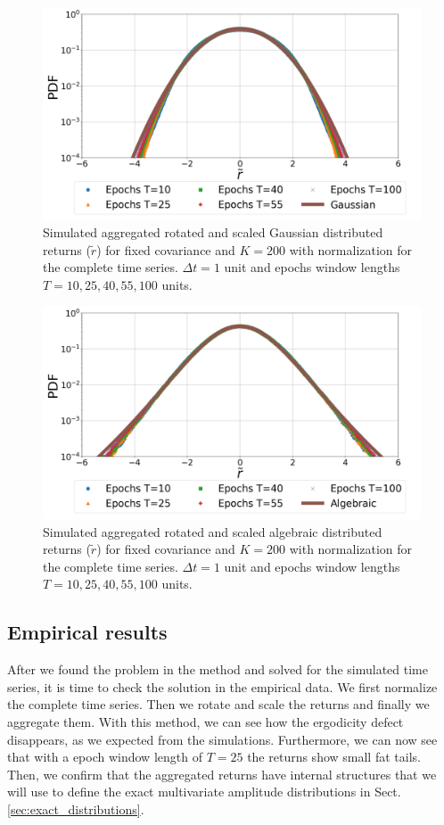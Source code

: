 \begin{figure}[htbp]
    \centering
    \includegraphics[width=0.6\columnwidth]
    {figures/06_epochs_sim_gauss_ts_norm.png}
    \caption{Simulated aggregated rotated and scaled Gaussian distributed
             returns ($\tilde{r}$) for fixed covariance and $K=200$ with
             normalization for the complete time series. $\Delta t = 1$ unit
             and epochs window lengths $T=10, 25, 40, 55, 100$ units.}
    \label{fig:epochs_gauss_agg_ret_pairs_norm_full_ts}
\end{figure}

\begin{figure}[htbp]
    \centering
    \includegraphics[width=0.6\columnwidth]
    {figures/06_epochs_sim_alg_ts_norm.png}
    \caption{Simulated aggregated rotated and scaled algebraic distributed
             returns ($\tilde{r}$) for fixed covariance and $K=200$ with
             normalization for the complete time series. $\Delta t = 1$ unit
             and epochs window lengths $T=10, 25, 40, 55, 100$ units.}
    \label{fig:epochs_alg_agg_ret_pairs_norm_full_ts}
\end{figure}

\subsection{Empirical results}
\label{subsec:emp_results}

After we found the problem in the method and solved for the simulated time
series, it is time to check the solution in the empirical data. We first
normalize the complete time series. Then we rotate and scale the returns and
finally we aggregate them. With this method, we can see how the ergodicity
defect disappears, as we expected from the simulations. Furthermore, we can now
see that with a epoch window length of $T = 25$ the returns show small fat
tails. Then, we confirm that the aggregated returns have internal structures
that we will use to define the exact multivariate amplitude distributions in
Sect. \ref{sec:exact_distributions}.

